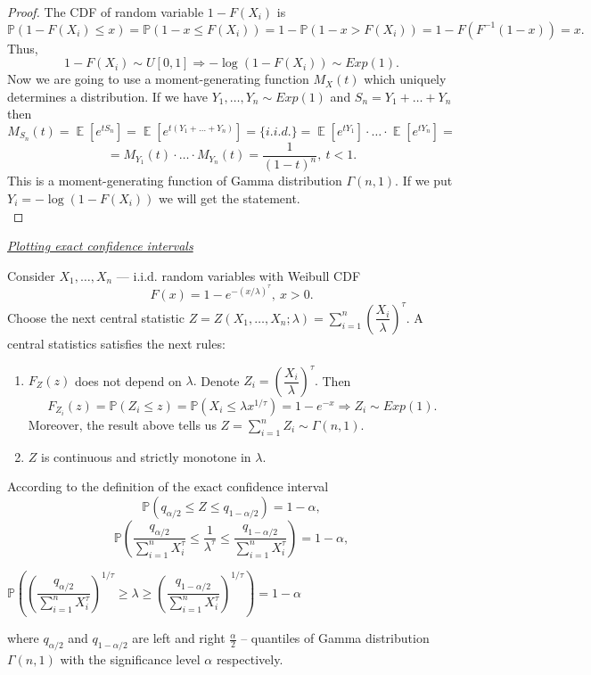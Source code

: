 \documentclass[a4paper, 12pt]{article}
\DeclareMathOperator*{\E}{\mathbb{E}}
\renewcommand*{\P}{\mathbb{P}}
\begin{document}
\begin{proof}
The CDF of random variable $1 - F(X_i)$ is 
$$
\P (1 - F(X_i) \leqslant x) = \P (1 - x \leqslant F(X_i)) = 1 - \P (1 - x > F(X_i)) = 1 - F(F^{-1}(1 - x)) = x.
$$
Thus, 
$$
1- F(X_i) \sim U[0, 1] \Rightarrow -\log (1 - F(X_i)) \sim Exp(1).
$$
Now we are going to use a moment-generating function $M_X(t)$ which uniquely determines a distribution. If we have $Y_1, \ldots, Y_n \sim Exp(1)$ and $S_n = Y_1 + \ldots + Y_n$ then
$$
M_{S_n}(t) = \E [e^{tS_n}] = \E [e^{t(Y_1 + \ldots + Y_n)}] = \{ i.i.d. \} = \E [e^{tY_1}] \cdot \ldots \cdot \E[e^{tY_n}] = 
$$
$$
= M_{Y_1}(t) \cdot \ldots \cdot M_{Y_n}(t) = \dfrac{1}{(1 - t)^n}, ~ t < 1.
$$
This is a moment-generating function of Gamma distribution $\Gamma(n, 1).$ If we put $Y_i = -\log (1 - F(X_i))$ we will get the statement.\\
\end{proof}
\begin{center}
\large \itshape \underline{Plotting exact confidence intervals}
\end{center}
Consider $X_1, \ldots, X_n$ --- i.i.d. random variables with Weibull CDF 
$$
F(x) = 1 - e^{-(x / \lambda)^{\tau}}, ~ x > 0.
$$
Choose the next central statistic $Z = Z(X_1,\ldots, X_n; \lambda) = \sum \limits_{i=1}^n \left( \dfrac{X_i}{\lambda} \right)^{\tau}.$
A central statistics satisfies the next rules:
\begin{enumerate}
	\item $F_Z(z)$ does not depend on $\lambda.$ Denote $Z_i = \left( \dfrac{X_i}{\lambda} \right)^{\tau}.$ Then
$$
F_{Z_i}(z) = \P (Z_i \leqslant z) = \P(X_i \leqslant \lambda x^{1/ \tau}) = 1 - e^{-x} \Rightarrow Z_i \sim Exp(1).
$$
Moreover, the result above tells us $Z = \sum \limits_{i=1}^n Z_i \sim \Gamma(n, 1).$
	\item $Z$ is continuous and strictly monotone in $\lambda.$   
\end{enumerate}
According to the definition of the exact confidence interval
$$
\P(q_{\alpha / 2} \leqslant Z \leqslant q_{1 - \alpha /2}) = 1 - \alpha,
$$
$$
\P \left( \dfrac{q_{\alpha / 2}}{\sum \limits_{i=1}^n X_i^{\tau}} \leqslant \dfrac{1}{\lambda^{\tau}} \leqslant \dfrac{q_{1 - \alpha /2}}{\sum \limits_{i=1}^n X_i^{\tau}} \right) = 1 - \alpha,
$$
\begin{tcolorbox}[enhanced,width=\textwidth,center upper,
    fontupper=\large\bfseries,drop fuzzy shadow southeast,
    colframe=red!50!black,colback=yellow!25]
$
\P \left( \left( \dfrac{q_{\alpha / 2}}{\sum \limits_{i=1}^n X_i^{\tau}} \right)^{1/ \tau} \geqslant \lambda \geqslant \left( \dfrac{q_{1 - \alpha /2}}{\sum \limits_{i=1}^n X_i^{\tau}} \right)^{1/ \tau} \right) = 1 - \alpha
$
\end{tcolorbox}
where $q_{\alpha/2}$ and $q_{1-\alpha/2}$ are left and right $\frac{\alpha}{2}$ -- quantiles of Gamma distribution $\Gamma(n, 1)$ with the significance level $\alpha$ respectively.
\end{document}
